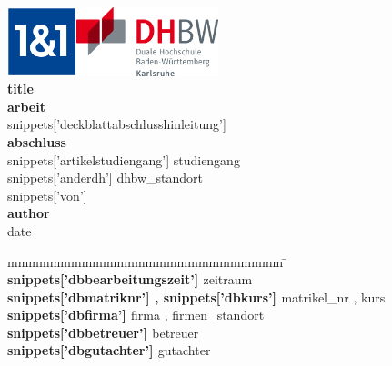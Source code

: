 
\begin{titlepage}
    \enlargethispage{20mm}
    \begin{center}
        \vspace*{-2cm}
\includegraphics[height=2cm]{images/1und1-logo}\hfill\includegraphics[height=2cm]{images/dhbw-logo}\\[2cm]
        \vspace*{12mm}  {\LARGE\bf {{ title }} }\\
        \vspace*{12mm}  {\large\bf {{ arbeit }} }\\
        \vspace*{12mm}  {{ snippets['deckblattabschlusshinleitung'] }} \\
        \vspace*{3mm}       {\bf {{ abschluss }} }\\
    \vspace*{12mm}  {{ snippets['artikelstudiengang'] }} {{ studiengang }}\\
    \vspace*{3mm}       {{ snippets['anderdh'] }} {{ dhbw_standort }}\\
        \vspace*{12mm}  {{ snippets['von'] }}\\
        \vspace*{3mm}       {\large\bf {{ author }} }\\
        \vspace*{12mm}  {{ date }}\\
    \end{center}
    \vfill
    \begin{spacing}{1.2}
    \begin{tabbing}
        mmmmmmmmmmmmmmmmmmmmmmmmmm                                         \= \kill
        \textbf{ {{ snippets['dbbearbeitungszeit'] }} }                    \>  {{ zeitraum }}\\
        \textbf{ {{ snippets['dbmatriknr'] }}, {{ snippets['dbkurs'] }} }  \>  {{ matrikel_nr }}, {{ kurs }}\\
        \textbf{ {{ snippets['dbfirma'] }} }                               \>  {{ firma }}, {{ firmen_standort }}\\
        \textbf{ {{ snippets['dbbetreuer'] }} }                            \>  {{ betreuer }}\\
        \textbf{ {{ snippets['dbgutachter'] }} }                           \>  {{ gutachter }}
    \end{tabbing}
    \end{spacing}
\end{titlepage}
